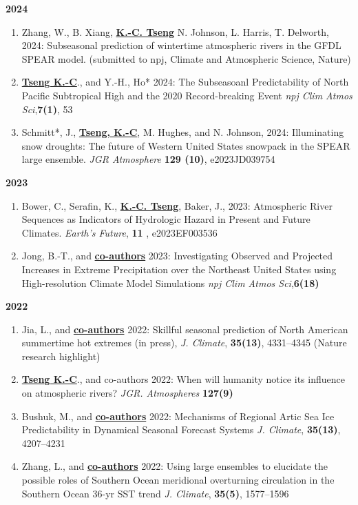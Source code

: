 \documentclass{article}
\begin{document}
\normalsize{\bf{2024}} 
\begin{enumerate}[resume]  
	\item Zhang, W., B. Xiang, \normalsize{\bf{\underline{K.-C. Tseng}}} N. Johnson, L. Harris, T. Delworth, 2024: Subseasonal prediction of wintertime atmospheric rivers in the GFDL SPEAR model. (submitted to npj, Climate and Atmospheric Science, Nature)
	\item \normalsize{\bf{\underline{Tseng K.-C}}}., and Y.-H., Ho* 2024: The Subseasoanl Predictability of North Pacific Subtropical High and the 2020 Record-breaking Event \textit{npj Clim Atmos Sci},\normalsize{\bf{7(1)}}, 53
	\item Schmitt*, J., \normalsize{\bf{\underline{Tseng, K.-C}}}, M. Hughes, and N. Johnson, 2024: Illuminating snow droughts: The future of Western United States snowpack in the SPEAR large ensemble. \textit{JGR Atmosphere} \normalsize{\bf{129 (10)}}, e2023JD039754
\end{enumerate}	
\normalsize{\bf{2023}} 
\begin{enumerate}[resume] 
	
	\item Bower, C., Serafin, K., \normalsize{\bf{\underline{K.-C. Tseng}}}, Baker, J., 2023: Atmospheric River Sequences as Indicators of Hydrologic Hazard in Present and Future Climates. \textit{Earth's Future}, \normalsize{\bf{11}} , e2023EF003536 \par
	\item Jong, B.-T., and \normalsize{\bf{\underline{co-authors}}} 2023: Investigating Observed and Projected Increases in Extreme Precipitation over the Northeast United States using High-resolution Climate Model Simulations  \textit{npj Clim Atmos Sci},\normalsize{\bf{6(18)}} \par

\end{enumerate}	
\normalsize{\bf{2022}} 
\begin{enumerate}[resume]     
	\item Jia, L., and \normalsize{\bf{\underline{co-authors}}} 2022: Skillful seasonal prediction of North American summertime hot extremes (in press), \textit{J. Climate}, \normalsize{\bf{35(13)}}, 4331--4345 (Nature research highlight)
	\item \normalsize{\bf{\underline{Tseng K.-C}}}., and co-authors 2022: When will humanity notice its influence on atmospheric rivers? \textit{JGR. Atmospheres} \normalsize{\bf{127(9)}} 
	\item Bushuk, M., and \normalsize{\bf{\underline{co-authors}}} 2022: Mechanisms of Regional Artic Sea Ice Predictability in Dynamical Seasonal Forecast Systems \textit{J. Climate}, \normalsize{\bf{35(13)}}, 4207--4231
	\item Zhang, L., and \normalsize{\bf{\underline{co-authors}}} 2022: Using large ensembles to elucidate the possible roles of Southern Ocean meridional overturning circulation in the Southern Ocean 36-yr SST trend \textit{J. Climate}, \normalsize{\bf{35(5)}}, 1577--1596
\end{enumerate}
\end{document}
